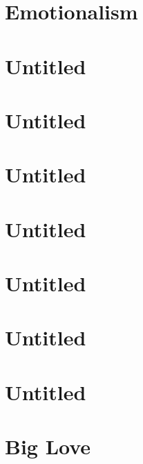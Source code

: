 \documentclass[oneside,14pt]{memoir} %
\newcommand{\chapterXXVIvar}{poem/untitled_6.tex}
\newcommand{\chapterXXVIIvar}{poem/emotionalism.tex}
\newcommand{\chapterXXVIIIvar}{poem/untitled_7.tex}
\newcommand{\chapterXXIXvar}{poem/untitled_8.tex}
\newcommand{\chapterXXXvar}{poem/untitled_9.tex}
\newcommand{\chapterXXXIvar}{poem/untitled_10.tex}
\newcommand{\chapterXXXIIvar}{poem/untitled_11.tex}
\newcommand{\chapterXXXIIIvar}{poem/untitled_12.tex}
\newcommand{\chapterXXXIVvar}{poem/untitled_13.tex}
\newcommand{\chapterXXXVvar}{poem/big_love.tex}
\begin{document}


\chapter{Emotionalism}



\chapter{Untitled}



\chapter{Untitled}



\chapter{Untitled}



\chapter{Untitled}



\chapter{Untitled}



\chapter{Untitled}



\chapter{Untitled}



\chapter{Big Love}


\end{document}
